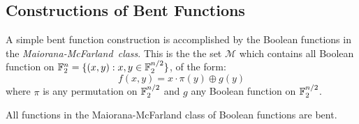 
\subsection{Constructions of Bent Functions}
\par A simple bent function construction is accomplished by the Boolean
functions in the {\em Maiorana-McFarland\ class}. This is the the set
$\mathcal{M}$ which contains all Boolean function on
$\mathbb{F}_2^n=\{(x,y):x,y\in\mathbb{F}_2^{n/2}\}$, of the form:
  \[
  f(x,y)=x\cdot\pi(y)\oplus g(y)
  \]
where $\pi$ is any permutation on $\mathbb{F}_2^{n/2}$ and $g$ any Boolean
function on $\mathbb{F}_2^{n/2}$.

\par All functions in the Maiorana-McFarland class of Boolean functions are
bent.
